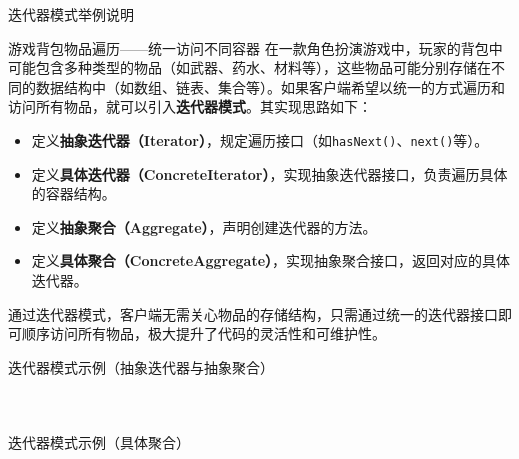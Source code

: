 \documentclass[UTF8,aspectratio=169]{beamer}
\begin{document}
\begin{frame}{迭代器模式举例说明}
    \begin{exampleytublock}{游戏背包物品遍历——统一访问不同容器}
        在一款角色扮演游戏中，玩家的背包中可能包含多种类型的物品（如武器、药水、材料等），这些物品可能分别存储在不同的数据结构中（如数组、链表、集合等）。如果客户端希望以统一的方式遍历和访问所有物品，就可以引入\textbf{迭代器模式}。其实现思路如下：
        \begin{itemize}
            \item 定义\textbf{抽象迭代器（Iterator）}，规定遍历接口（如\texttt{hasNext()}、\texttt{next()}等）。
            \item 定义\textbf{具体迭代器（ConcreteIterator）}，实现抽象迭代器接口，负责遍历具体的容器结构。
            \item 定义\textbf{抽象聚合（Aggregate）}，声明创建迭代器的方法。
            \item 定义\textbf{具体聚合（ConcreteAggregate）}，实现抽象聚合接口，返回对应的具体迭代器。
        \end{itemize}
        通过迭代器模式，客户端无需关心物品的存储结构，只需通过统一的迭代器接口即可顺序访问所有物品，极大提升了代码的灵活性和可维护性。
    \end{exampleytublock}
\end{frame}

\begin{frame}{迭代器模式示例（抽象迭代器与抽象聚合）}
    \begin{columns}
        \begin{column}{0.48\textwidth}
            \inputminted[firstline=1, lastline=14]{cpp}{code/iterator_pattern.cpp}
        \end{column}
        \begin{column}{0.48\textwidth}
            \inputminted[firstline=16, lastline=23]{cpp}{code/iterator_pattern.cpp}
        \end{column}
    \end{columns}
\end{frame}

\begin{frame}{迭代器模式示例（具体聚合）}
    \begin{columns}
        \begin{column}{0.48\textwidth}
            \inputminted[firstline=25, lastline=44]{cpp}{code/iterator_pattern.cpp}
        \end{column}
        \begin{column}{0.48\textwidth}
            \inputminted[firstline=45, lastline=61]{cpp}{code/iterator_pattern.cpp}
        \end{column}
    \end{columns}
\end{frame}
\end{document}
